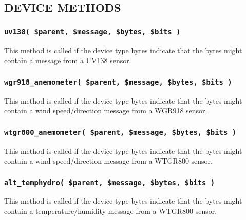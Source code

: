 \documentclass[12pt,a4paper]{article}
\begin{document}
\subsection*{DEVICE METHODS\label{xPL::RF::Oregon_DEVICE_METHODS}}
\subsubsection*{\texttt{uv138( \$parent, \$message, \$bytes, \$bits )}\label{xPL::RF::Oregon_uv138_parent_message_bytes_bits_}}


This method is called if the device type bytes indicate that the bytes
might contain a message from a UV138 sensor.

\subsubsection*{\texttt{wgr918\_anemometer( \$parent, \$message, \$bytes, \$bits )}\label{xPL::RF::Oregon_wgr918_anemometer_parent_message_bytes_bits_}}


This method is called if the device type bytes indicate that the bytes
might contain a wind speed/direction message from a WGR918 sensor.

\subsubsection*{\texttt{wtgr800\_anemometer( \$parent, \$message, \$bytes, \$bits )}\label{xPL::RF::Oregon_wtgr800_anemometer_parent_message_bytes_bits_}}


This method is called if the device type bytes indicate that the bytes
might contain a wind speed/direction message from a WTGR800 sensor.

\subsubsection*{\texttt{alt\_temphydro( \$parent, \$message, \$bytes, \$bits )}\label{xPL::RF::Oregon_alt_temphydro_parent_message_bytes_bits_}}


This method is called if the device type bytes indicate that the bytes
might contain a temperature/humidity message from a WTGR800 sensor.
\end{document}
